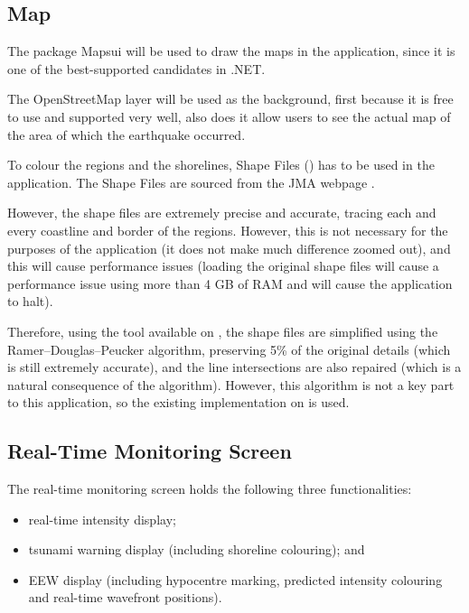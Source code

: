 \subsection{Map}

The package Mapsui \autocite{mapsui-github} will be used to draw the maps in the application, since it is one of the best-supported candidates in .NET.

The OpenStreetMap layer will be used as the background, first because it is free to use and supported very well, also does it allow users to see the actual map of the area of which the earthquake occurred.

To colour the regions and the shorelines, Shape Files () has to be used in the application. The Shape Files are sourced from the JMA webpage \autocite{jma-shapefiles}.

However, the shape files are extremely precise and accurate, tracing each and every coastline and border of the regions. However, this is not necessary for the purposes of the application (it does not make much difference zoomed out), and this will cause performance issues (loading the original shape files will cause a performance issue using more than 4 GB of RAM and will cause the application to halt).

Therefore, using the tool available on \autocite{soft-mapshaper}, the shape files are simplified using the Ramer--Douglas--Peucker algorithm, preserving 5\% of the original details (which is still extremely accurate), and the line intersections are also repaired (which is a natural consequence of the algorithm). However, this algorithm is not a key part to this application, so the existing implementation on \autocite{soft-mapshaper} is used.

\subsection{Real-Time Monitoring Screen}

The real-time monitoring screen holds the following three functionalities:
\begin{itemize}
    \item real-time intensity display;
    \item tsunami warning display (including shoreline colouring); and
    \item EEW display (including hypocentre marking, predicted intensity colouring and real-time wavefront positions).
\end{itemize}


